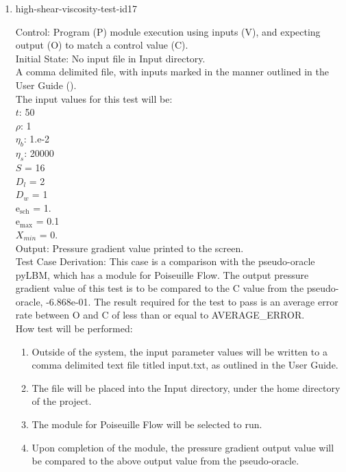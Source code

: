 \documentclass[12pt, titlepage]{article}
\begin{document}
\begin{enumerate}
\item{high-shear-viscosity-test-id17\\}

Control: Program (P) module execution using inputs (V), and expecting output (O) to match a control value (C).\\
					
Initial State: No input file in Input directory.\\
					
A comma delimited file, with inputs marked in the manner outlined in the User Guide (\citet{LBM_UserGuide_PM}).\\The input values for this test will be:\\
$t$: 50\\
$\rho$: 1\\
$\eta_b$: 1.e-2\\
$\eta_s$: 20000\\
$S$ = 16\\
$D_{l}$ = 2\\
$D_{w}$ = 1\\
$\mathrm{e_{sch}}$ = 1.\\
$\mathrm{e_{max}}$ = 0.1\\
$X_{min}$ = 0.\\

					
Output: Pressure gradient value printed to the screen. \\ 

Test Case Derivation: This case is a comparison with the pseudo-oracle pyLBM, which has a module for Poiseuille Flow. The output pressure gradient value of this test is to be compared to the C value from the pseudo-oracle, -6.868e-01. The result required for the test to pass is an average error rate between O and C of less than or equal to AVERAGE\_ERROR.\\

					
How test will be performed: 

\begin{enumerate}
\item Outside of the system, the input parameter values will be written to a comma delimited text file titled input.txt, as outlined in the User Guide.
\item The file will be placed into the Input directory, under the home directory of the project.
\item The module for Poiseuille Flow will be selected to run.
\item Upon completion of the module, the pressure gradient output value will be compared to the above output value from the pseudo-oracle.
\end{enumerate}	

\end{enumerate}
\end{document}
